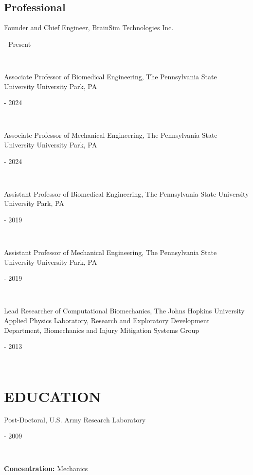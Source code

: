 \documentclass[a4paper,10pt]{article}
\begin{document}
    \subsection*{Professional}
    
            \noindent \parbox[t]{0.8\linewidth}{\raggedright Founder and Chief Engineer, BrainSim Technologies Inc.} \hfill \parbox[t]{0.2\linewidth}{ - Present} \\
            
            \noindent \parbox[t]{0.8\linewidth}{\raggedright Associate Professor of Biomedical Engineering, The Pennsylvania State University
University Park, PA} \hfill \parbox[t]{0.2\linewidth}{ - 2024} \\
            
            \noindent \parbox[t]{0.8\linewidth}{\raggedright Associate Professor of Mechanical Engineering, The Pennsylvania State University
University Park, PA} \hfill \parbox[t]{0.2\linewidth}{ - 2024} \\
            
            \noindent \parbox[t]{0.8\linewidth}{\raggedright Assistant Professor of Biomedical Engineering, The Pennsylvania State University
University Park, PA} \hfill \parbox[t]{0.2\linewidth}{ - 2019} \\
            
            \noindent \parbox[t]{0.8\linewidth}{\raggedright Assistant Professor of Mechanical Engineering, The Pennsylvania State University
University Park, PA} \hfill \parbox[t]{0.2\linewidth}{ - 2019} \\
            
            \noindent \parbox[t]{0.8\linewidth}{\raggedright Lead Researcher of Computational Biomechanics, The Johns Hopkins University Applied Physics Laboratory, Research and Exploratory Development Department, Biomechanics and Injury Mitigation Systems Group} \hfill \parbox[t]{0.2\linewidth}{ - 2013} \\
            

    \section*{EDUCATION}
    
            \noindent \parbox[t]{0.8\linewidth}{\raggedright Post-Doctoral, U.S. Army Research Laboratory} \hfill \parbox[t]{0.2\linewidth}{ - 2009} \\
            \noindent \parbox[t]{0.8\linewidth}{\raggedright \textbf{Concentration:} Mechanics} \\
            
\end{document}
